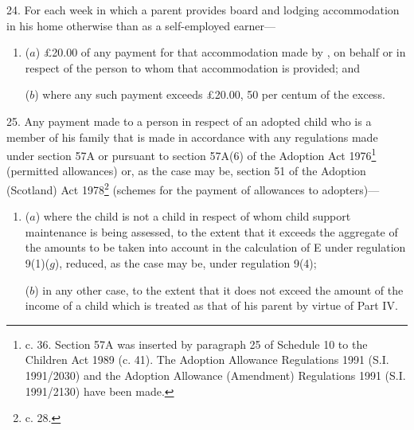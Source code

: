 \documentclass[12pt,a4paper]{article}
\begin{document}

\medskip

24.  
For each week in which a parent provides  %
board and lodging accommodation in his home otherwise than as a self-employed earner—
\begin{enumerate}\item[]
($a$) £20.00 of any payment for that accommodation made by%
, on behalf or in respect of  %
the person to whom that accommodation is provided; and

($b$) where any such payment exceeds £20.00, 50 per centum of the excess.
\end{enumerate}


\medskip

25.  Any payment made to a person in respect of an adopted child who is a member of his family that is made in accordance with any regulations made under section 57A or pursuant to section 57A(6) of the Adoption Act 1976\footnote{ c. 36. Section 57A was inserted by paragraph 25 of Schedule 10 to the Children Act 1989 (c. 41). The Adoption Allowance Regulations 1991 (S.I. 1991/2030) and the Adoption Allowance (Amendment) Regulations 1991 (S.I. 1991/2130) have been made.} (permitted allowances) or, as the case may be, section 51 of the Adoption (Scotland) Act 1978\footnote{ c. 28.} (schemes for the payment of allowances to adopters)—
\begin{enumerate}\item[]
($a$) where the child is not a child in respect of whom child support maintenance is being assessed, to the extent that it exceeds 
the aggregate of the amounts to be taken into account in the calculation of E under regulation 9(1)($g$), %
reduced, as the case may be, under regulation 9(4);

($b$) in any other case, to the extent that it does not exceed the amount of the income of a child which is treated as that of his parent by virtue of Part IV.
\end{enumerate}
\end{document}
